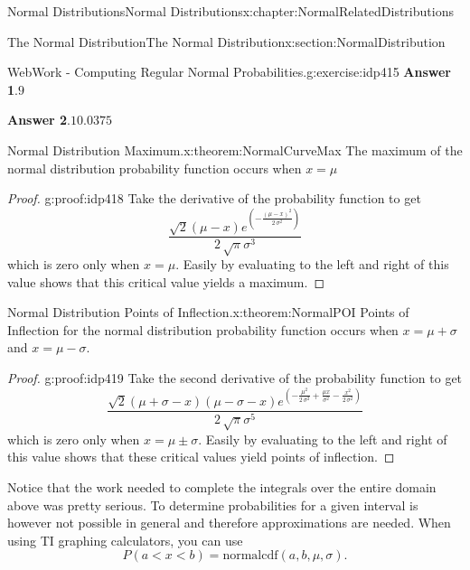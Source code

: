 \documentclass[oneside,10pt,]{book}
\newcommand{\blocktitlefont}{\relax}
\numberwithin{equation}{section}
\newcommand{\lt}{<}
\begin{document}
\begin{chapterptx}{Normal Distributions}{}{Normal Distributions}{}{}{x:chapter:NormalRelatedDistributions}
\begin{sectionptx}{The Normal Distribution}{}{The Normal Distribution}{}{}{x:section:NormalDistribution}
\begin{inlineexercise}{WebWork - Computing Regular Normal Probabilities.}{g:exercise:idp415}
\noindent\textbf{\blocktitlefont Answer 1}.\hypertarget{g:answer:idp416}{}\quad{}\(9\)%
\par\smallskip%
\noindent\textbf{\blocktitlefont Answer 2}.\hypertarget{g:answer:idp417}{}\quad{}\(10.0375\)%
\end{inlineexercise}%
\begin{theorem}{Normal Distribution Maximum.}{}{x:theorem:NormalCurveMax}%
The maximum of the normal distribution probability function occurs when \(x = \mu\)%
\end{theorem}
\begin{proof}{}{g:proof:idp418}
Take the derivative of the probability function to get%
\begin{equation*}
\frac{\sqrt{2} {\left(\mu - x\right)} e^{\left(-\frac{{\left(\mu - x\right)}^{2}}{2 \, \sigma^{2}}\right)}}{2 \, \sqrt{\pi} \sigma^{3}}
\end{equation*}
which is zero only when \(x = \mu\).  Easily by evaluating to the left and right of this value shows that this critical value yields a maximum.%
\end{proof}
%
\par
\begin{theorem}{Normal Distribution Points of Inflection.}{}{x:theorem:NormalPOI}%
Points of Inflection for the normal distribution probability function occurs when \(x = \mu + \sigma\) and \(x = \mu - \sigma\).%
\end{theorem}
\begin{proof}{}{g:proof:idp419}
Take the second derivative of the probability function to get%
\begin{equation*}
\frac{\sqrt{2} {\left(\mu + \sigma - x\right)} {\left(\mu - \sigma - x\right)} e^{\left(-\frac{\mu^{2}}{2 \, \sigma^{2}} + \frac{\mu x}{\sigma^{2}} - \frac{x^{2}}{2 \, \sigma^{2}}\right)}}{2 \, \sqrt{\pi} \sigma^{5}}
\end{equation*}
which is zero only when \(x = \mu \pm \sigma\).  Easily by evaluating to the left and right of this value shows that these critical values yield points of inflection.%
\end{proof}
%
\par
Notice that the work needed to complete the integrals over the entire domain above was pretty serious. To determine probabilities for a given interval is however not possible in general and therefore approximations are needed. When using TI graphing calculators, you can use%
\begin{equation*}
P( a \lt x \lt b ) = \text{normalcdf}(a,b,\mu, \sigma).

\end{equation*}
\end{sectionptx}
\end{chapterptx}
\end{document}

